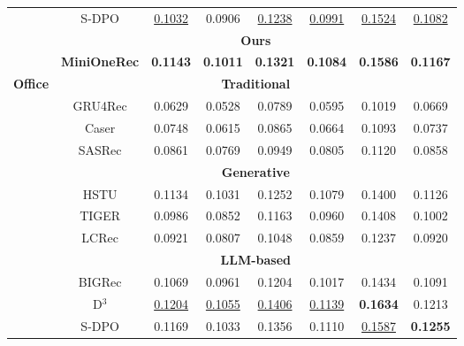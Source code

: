 \begin{table}[t]
\begin{adjustbox}{max width=0.9\textwidth}
\begin{tabular}{cccccccc}
                                      & S-DPO      & \uline{0.1032} & 0.0906 & \uline{0.1238} & \uline{0.0991} & \uline{0.1524} & \uline{0.1082}  \\ \cmidrule(lr){2-8}
                                      & \multicolumn{7}{c}{\textbf{Ours}}                                 \\ \cmidrule(lr){2-8}
                                      & \cellcolor[HTML]{ECF4FF}\textbf{MiniOneRec}      & \cellcolor[HTML]{ECF4FF}\textbf{0.1143} & \cellcolor[HTML]{ECF4FF}\textbf{0.1011} & \cellcolor[HTML]{ECF4FF}\textbf{0.1321} & \cellcolor[HTML]{ECF4FF}\textbf{0.1084} & \cellcolor[HTML]{ECF4FF}\textbf{0.1586} & \cellcolor[HTML]{ECF4FF}\textbf{0.1167}  \\
                                      \midrule
\multirow{14}{*}{\textbf{Office}}     & \multicolumn{7}{c}{\textbf{Traditional}}                          \\ \cmidrule(lr){2-8}
                                      & GRU4Rec    & 0.0629 & 0.0528 & 0.0789 & 0.0595 & 0.1019 & 0.0669  \\
                                      & Caser      & 0.0748 & 0.0615 & 0.0865 & 0.0664 & 0.1093 & 0.0737  \\
                                      & SASRec     & 0.0861 & 0.0769 & 0.0949 & 0.0805 & 0.1120 & 0.0858  \\ \cmidrule(lr){2-8}
                                      & \multicolumn{7}{c}{\textbf{Generative}}                           \\ \cmidrule(lr){2-8}
                                      & HSTU       & 0.1134 & 0.1031 & 0.1252 & 0.1079 & 0.1400 & 0.1126  \\
                                      & TIGER      & 0.0986 & 0.0852 & 0.1163 & 0.0960 & 0.1408 & 0.1002  \\
                                      & LCRec      & 0.0921 & 0.0807 &    0.1048 & 0.0859 & 0.1237 & 0.0920  \\ \cmidrule(lr){2-8}
                                      & \multicolumn{7}{c}{\textbf{LLM-based}}                            \\ \cmidrule(lr){2-8}
                                      & BIGRec     & 0.1069 & 0.0961 & 0.1204 & 0.1017 & 0.1434 & 0.1091  \\
                                      & D$^{3}$         & \uline{0.1204} & \uline{0.1055} & \uline{0.1406} & \uline{0.1139} & \textbf{0.1634} & 0.1213  \\
                                      & S-DPO      & 0.1169 & 0.1033 & 0.1356 & 0.1110 & \uline{0.1587} & \textbf{0.1255}  \\ \cmidrule(lr){2-8}

\end{tabular}
\end{adjustbox}
\end{table}
